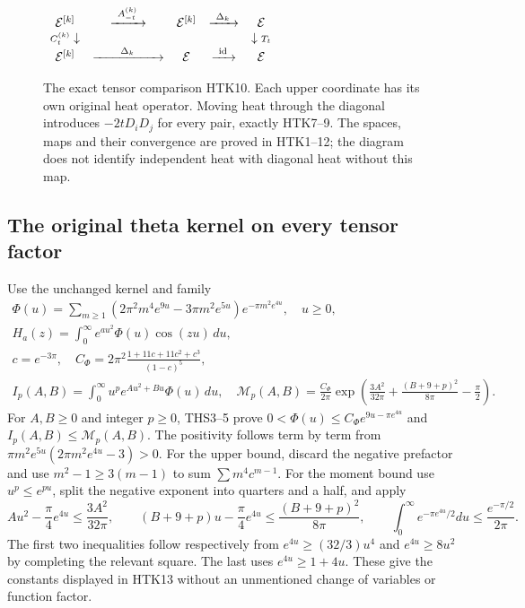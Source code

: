 \begin{figure}[ht]
\centering
$\begin{array}{ccccc}
 \mathcal E^{[k]}&\xrightarrow{\ A_{-t}^{(k)}\ }&
 \mathcal E^{[k]}&\xrightarrow{\ \Delta_k\ }&\mathcal E\\
 {\scriptstyle C_t^{(k)}}\downarrow&&&&\downarrow{\scriptstyle T_t}\\
 \mathcal E^{[k]}&\xrightarrow{\hspace{7mm}\Delta_k\hspace{7mm}}&
 \mathcal E&\xrightarrow{\ \operatorname{id}\ }&\mathcal E
 \end{array}$
\caption{The exact tensor comparison HTK10. Each upper coordinate
has its own original heat operator. Moving heat through the diagonal
introduces $-2tD_iD_j$ for every pair, exactly HTK7--9. The spaces,
maps and their convergence are proved in HTK1--12; the diagram does
not identify independent heat with diagonal heat without this map.}
\end{figure}

\subsection{The original theta kernel on every tensor factor}

Use the unchanged kernel and family
\begin{equation}\tag{HTK13}
\begin{gathered}
 \Phi(u)=\sum_{m\ge1}
   (2\pi^2m^4e^{9u}-3\pi m^2e^{5u})e^{-\pi m^2e^{4u}},
       \quad u\ge0,\\
 H_a(z)=\int_0^\infty e^{au^2}\Phi(u)\cos(zu)\,du,\\
 c=e^{-3\pi},\quad
 C_\Phi=2\pi^2\frac{1+11c+11c^2+c^3}{(1-c)^5},\\
 I_p(A,B)=\int_0^\infty u^pe^{Au^2+Bu}\Phi(u)\,du,
 \quad
 \mathcal M_p(A,B)=\frac{C_\Phi}{2\pi}
     \exp\left(\frac{3A^2}{32\pi}
         +\frac{(B+9+p)^2}{8\pi}-\frac\pi2\right).
\end{gathered}
\end{equation}
For $A,B\ge0$ and integer $p\ge0$, THS3--5 prove
$0<\Phi(u)\le C_\Phi e^{9u-\pi e^{4u}}$ and
$I_p(A,B)\le\mathcal M_p(A,B)$. The positivity follows
term by term from
$\pi m^2e^{5u}(2\pi m^2e^{4u}-3)>0$. For the upper bound,
discard the negative prefactor and use
$m^2-1\ge3(m-1)$ to sum $\sum m^4c^{m-1}$.
For the moment bound use $u^p\le e^{pu}$, split the negative
exponent into quarters and a half, and apply
\[
 Au^2-\frac\pi4e^{4u}\le\frac{3A^2}{32\pi},\qquad
 (B+9+p)u-\frac\pi4e^{4u}\le\frac{(B+9+p)^2}{8\pi},
 \qquad
 \int_0^\infty e^{-\pi e^{4u}/2}du\le\frac{e^{-\pi/2}}{2\pi}.
\]
The first two inequalities follow respectively from
$e^{4u}\ge(32/3)u^4$ and $e^{4u}\ge8u^2$ by completing
the relevant square. The last uses $e^{4u}\ge1+4u$.
These give the constants displayed in HTK13 without an
unmentioned change of variables or function factor.


